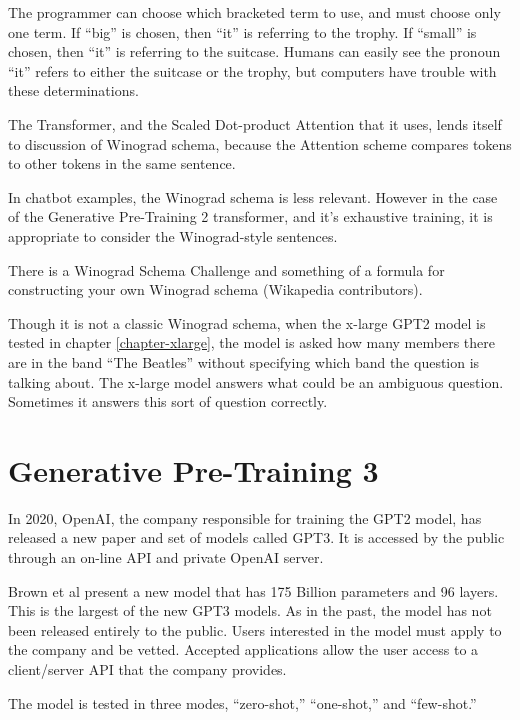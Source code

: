 The programmer can choose which bracketed term to use, and must choose only one term. If ``big'' is chosen, then ``it'' is referring to the trophy. If ``small'' is chosen, then ``it'' is referring to the suitcase. Humans can easily see the pronoun ``it'' refers to either the suitcase or the trophy, but computers have trouble with these determinations.

The Transformer, and the Scaled Dot-product Attention that it uses, lends itself to discussion of Winograd schema, because the Attention scheme compares tokens to other tokens in the same sentence. 

In chatbot examples, the Winograd schema is less relevant. %
However in the case of the Generative Pre-Training 2 transformer, and it's exhaustive training, it is appropriate to consider the Winograd-style sentences.

There is a Winograd Schema Challenge and something of a formula for constructing your own Winograd schema (Wikapedia contributors). \cite{wiki:xxx}

Though it is not a classic Winograd schema, when the x-large GPT2 model is tested in chapter \ref{chapter-xlarge}, the model is asked how many members there are in the band ``The Beatles'' without specifying which band the question is talking about. The x-large model answers what could be an ambiguous question. Sometimes it answers this sort of question correctly.

\section{Generative Pre-Training 3}

\label{discussion-gpt3}

In 2020, OpenAI, the company responsible for training the GPT2 model, has released a new paper and set of models called GPT3. It is accessed by the public through an on-line API and private OpenAI server.

Brown et al \cite{brown2020language} present a new model that has 175 Billion parameters and 96 layers. This is the largest of the new GPT3 models. As in the past, the model has not been released entirely to the public. Users interested in the model must apply to the company and be vetted. Accepted applications allow the user access to a client/server API that the company provides.

The model is tested in three modes, ``zero-shot,'' ``one-shot,'' and ``few-shot.'' 

